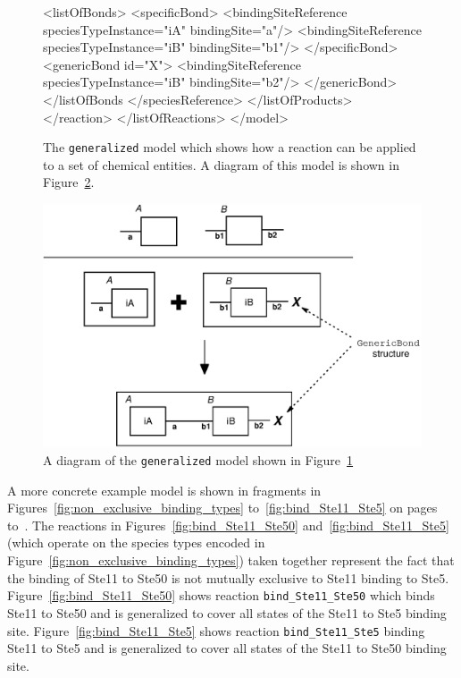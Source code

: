 \documentclass{cekarticle}
\begin{document}
\begin{figure}[h]
\begin{example}
                    <listOfBonds>
                        <specificBond>
                            <bindingSiteReference speciesTypeInstance="iA" bindingSite="a"/>
                            <bindingSiteReference speciesTypeInstance="iB" bindingSite="b1"/>
                        </specificBond>
                        <genericBond id="X">
                            <bindingSiteReference speciesTypeInstance="iB" bindingSite="b2"/>
                        </genericBond>
                    </listOfBonds
            </speciesReference>
            </listOfProducts>
        </reaction>
    </listOfReactions>
</model>
\end{example}
  \caption{The \texttt{generalized} model which shows how a reaction can be applied to a set
  of chemical entities. A diagram of this model is shown in Figure~\ref{fig:generalized}.}
  \label{fig:generalized-xml}
\end{figure}

\begin{figure}[h]
  \vspace*{8pt}
  \centering
  \includegraphics[scale = 0.7]{generalized.eps}
  \caption{A diagram of the \texttt{generalized} model shown in Figure~\ref{fig:generalized-xml}}
  \label{fig:generalized}
\end{figure}

A more concrete example model is shown in fragments in Figures~\ref{fig:non_exclusive_binding_types}
to~\ref{fig:bind_Ste11_Ste5}
on pages~\pageref{fig:non_exclusive_binding_types} to~\pageref{fig:bind_Ste11_Ste5}.
The reactions in Figures~\ref{fig:bind_Ste11_Ste50} and~\ref{fig:bind_Ste11_Ste5}
(which operate on the species types encoded in Figure~\ref{fig:non_exclusive_binding_types})
taken together represent the fact that the binding of
Ste11 to Ste50 is not mutually exclusive to Ste11 binding to Ste5.
Figure~\ref{fig:bind_Ste11_Ste50} shows reaction \texttt{bind\_Ste11\_Ste50} which binds Ste11 to
Ste50 and is generalized to cover all states of the Ste11 to Ste5 binding site.
Figure~\ref{fig:bind_Ste11_Ste5} shows reaction \texttt{bind\_Ste11\_Ste5} binding Ste11 to
Ste5 and is generalized to cover all states of the Ste11 to Ste50 binding site.
\end{document}
